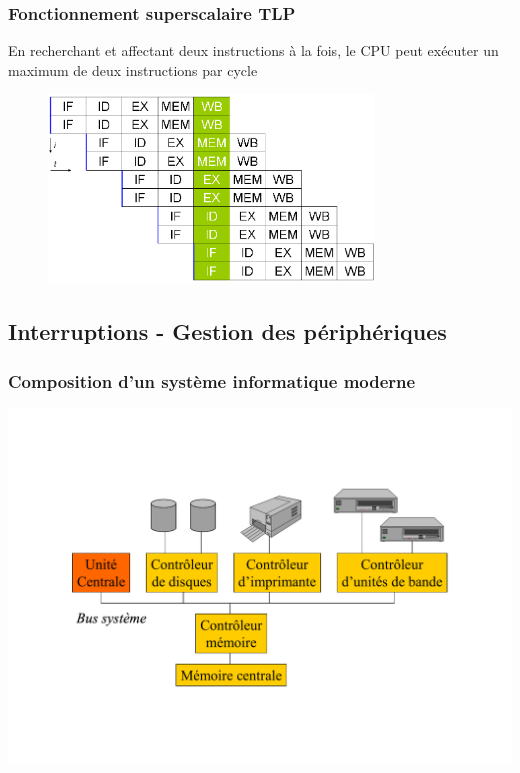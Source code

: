 \begin{frame}
\frametitle{Fonctionnement superscalaire TLP}
En recherchant et affectant deux instructions à la fois, le CPU peut exécuter un maximum de deux instructions par cycle \cite{wp-cpu}
\begin{figure}
\includegraphics[height=5cm]{../illustration/Superscalarpipeline.png}
\end{figure}
\end{frame}


\subsection{Interruptions - Gestion des périphériques}

\begin{frame}
 \frametitle{Composition d’un système informatique moderne}
 \includegraphics[width=\textwidth]{../illustration/archi_si.pdf}
\end{frame}


